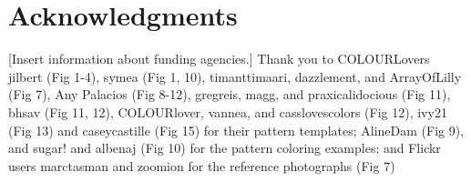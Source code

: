 \section*{Acknowledgments}

[Insert information about funding agencies.] Thank you to COLOURLovers jilbert (Fig 1-4), symea (Fig 1, 10), timanttimaari, dazzlement, and ArrayOfLilly (Fig 7), Any Palacios (Fig 8-12), gregreis, magg, and praxicalidocious (Fig 11), bhsav (Fig 11, 12), COLOURlover, vannea, and casslovescolors (Fig 12), ivy21 (Fig 13) and caseycastille (Fig 15) for their pattern templates; AlineDam (Fig 9), and sugar! and albenaj (Fig 10) for the pattern coloring examples; and Flickr users marctasman and zoomion for the reference photographs (Fig 7)       

